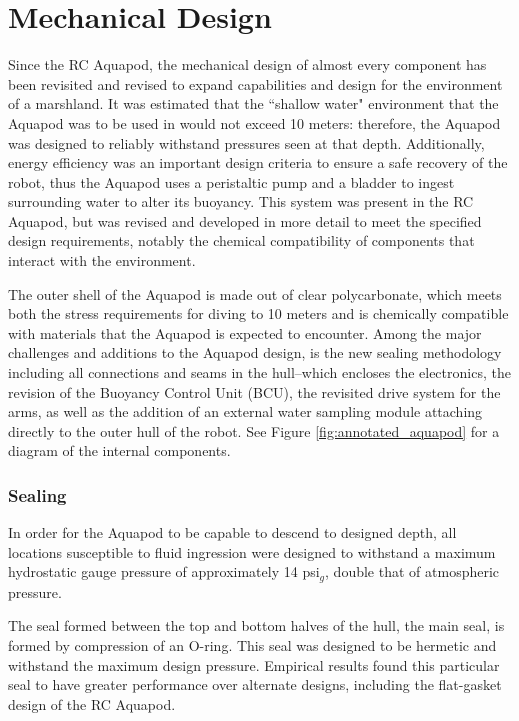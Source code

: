 \section{ Mechanical Design}

Since the RC Aquapod, the mechanical design of almost every component has been
revisited and revised to expand capabilities and design for the environment of a marshland.  It was estimated
that the ``shallow water" environment that the Aquapod was to be used in would
not exceed 10 meters: therefore, the Aquapod was designed to reliably withstand
pressures seen at that depth.  Additionally, energy efficiency was an important
design criteria to ensure a safe recovery of the robot, thus the Aquapod uses a
peristaltic pump and a bladder to ingest surrounding water to alter its
buoyancy.  This system was present in the RC Aquapod, but was revised and
developed in more detail to meet the specified design requirements, notably the
chemical compatibility of components that interact with the environment.

The outer shell of the Aquapod is made out of clear polycarbonate, which meets
both the stress requirements for diving to 10 meters and is chemically
compatible with materials that the Aquapod is expected to encounter.  Among the
major challenges and additions to the Aquapod design, is the new sealing
methodology including all connections and seams in the hull--which encloses the
electronics, the revision of the Buoyancy Control Unit (BCU), the revisited
drive system for the arms, as well as the addition of an external water sampling
module attaching directly to the outer hull of the robot. See Figure
\ref{fig:annotated_aquapod} for a diagram of the internal components.

  \subsubsection{Sealing} In order for the Aquapod to be capable to descend to
  designed depth, all locations susceptible to fluid ingression were designed to
  withstand a maximum hydrostatic gauge pressure of approximately 14 psi\(_g\),
  double that of atmospheric pressure.

    The seal formed between the top and bottom halves of the hull, the main
    seal, is formed by compression of an O-ring. This seal was designed to be
    hermetic and withstand the maximum design pressure.  Empirical results found
    this particular seal to have greater performance over alternate designs,
    including the flat-gasket design of the RC Aquapod.

